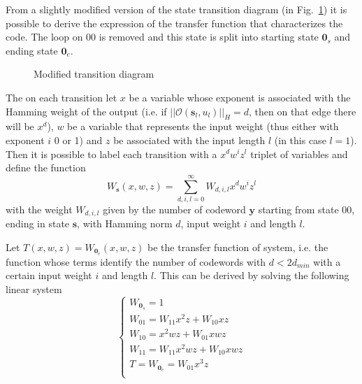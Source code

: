 \documentclass[10pt]{article}
\newcommand{\outf}[1] {\mathcal{O}(#1)}
\newcommand{\s} {\mathbf{s}}
\begin{document}
From a slightly modified version of the state transition diagram (in Fig.~\ref{fig:state_t}) it is possible to derive the expression of the transfer function that characterizes the code. The loop on $00$ is removed and this state is split into starting state $\mathbf{0}_s$ and ending state $\mathbf{0}_e$.

\begin{figure}
\centering
{}
\caption{Modified transition diagram}
\label{fig:state_t}
\end{figure}

The on each transition let $x$ be a variable whose exponent is associated with the Hamming weight of the output (i.e. if $||\outf{\s_l, u_l}||_H = d$, then on that edge there will be $x^d$), $w$ be a variable that represents the input weight (thus either with exponent $i$ 0 or 1) and $z$ be associated with the input length $l$ (in this case $l=1$). Then it is possible to label each transition with a $x^dw^iz^l$ triplet of variables and define the function
\begin{equation}
	W_{\mathbf{s}}(x, w, z) = \sum_{d, i, l = 0}^{\infty}W_{d, i, l} x^dw^iz^l
\end{equation}
with the weight $W_{d, i, l}$ given by the number of codeword $\mathbf{y}$ starting from state $00$, ending in state $\mathbf{s}$, with Hamming norm $d$, input weight $i$ and length $l$. 

Let $T(x, w, z) = W_{\mathbf{0}_e} (x, w, z)$ be the transfer function of system, i.e. the function whose terms identify the number of codewords with $d < 2d_{min}$ with a certain input weight $i$ and length $l$. This can be derived by solving the following linear system
\begin{equation}\label{eq:s1}
\begin{cases}
	W_{\mathbf{0}_s} = 1 \\ %
	W_{01} = W_{11}x^2z + W_{10}xz \\
	W_{10} = x^2wz + W_{01}xwz \\
	W_{11} = W_{11}x^2wz + W_{10}xwz \\
	T = W_{\mathbf{0}_e} = W_{01}x^3z\\
\end{cases}
\end{equation}
\end{document}
